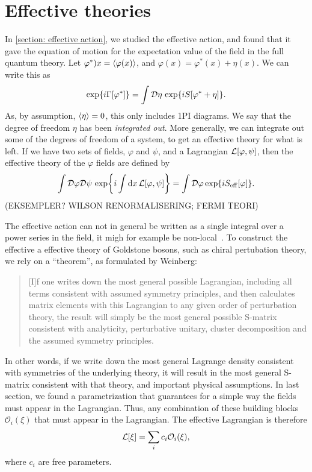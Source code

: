 \section{Effective theories}
In \autoref{section: effective action}, we studied the effective action, and found that it gave the equation of motion for the expectation value of the field in the full quantum theory.
Let $\varphi^*)x = \ex{\varphi(x)}$, and $\varphi(x) = \varphi^*(x) + \eta(x)$.
We can write this as
\begin{equation}
    \exp{i \Gamma[\varphi^*]} = \int \mathcal{D} \eta \, \exp{i S[\varphi^* + \eta]}.
\end{equation}
As, by assumption, $\ex{\eta} = 0$, this only includes 1PI diagrams.
We say that the degree of freedom $\eta$ has been \emph{integrated out}.
More generally, we can integrate out some of the degrees of freedom of a system, to get an effective theory for what is left.
If we have two sets of fields, $\varphi$ and $\psi$, and a Lagrangian $\mathcal{L}[\varphi, \psi]$, then the effective theory of the $\varphi$ fields are defined by
\begin{equation}
    \int \mathcal{D}\varphi \mathcal{D} \psi \, \exp{i\int \dd x\, \mathcal{L}[\varphi, \psi]}
    = \int \mathcal{D} \varphi \exp{i S_\mathrm{eff}[\varphi]}.
\end{equation}
(EKSEMPLER? WILSON RENORMALISERING; FERMI TEORI)

The effective action can not in general be written as a single integral over a power series in the field, it migh for example be non-local~\cite{Schwartz:QFT}.
To construct the effective a effective theory of Goldstone bosons, such as chiral pertubation theory, we rely on a ``theorem'', as formulated by Weinberg:
\begin{quote}
    [I]f one writes down the most general possible Lagrangian, including all terms consistent with assumed symmetry principles, and then calculates matrix elements with this Lagrangian to any given order of perturbation theory, the result will simply be the most general possible S-matrix consistent with analyticity, perturbative unitary, cluster decomposition and the assumed symmetry principles. \cite{WeinbergPhenom}
\end{quote}
In other words, if we write down the most general Lagrange density consistent with symmetries of the underlying theory, it will result in the most general S-matrix consistent with that theory, and important physical assumptions.
In last section, we found a parametrization that guarantees for a simple way the fields must appear in the Lagrangian.
Thus, any combination of these building blocks $\mathcal{O}_i(\xi)$ that must appear in the Lagrangian.
The effective Lagrangian is therefore
\begin{equation}
    \mathcal{L}[\xi] = \sum_i c_i \mathcal{O}_i(\xi),
\end{equation}
where $c_i$ are free parameters.

